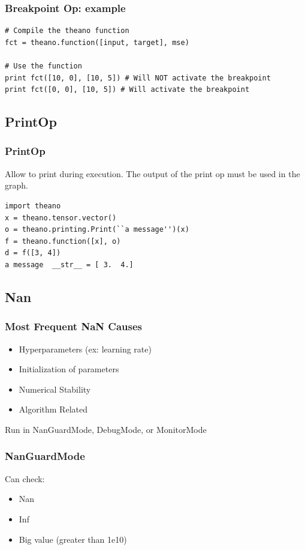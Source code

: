 \documentclass[utf8x,xcolor=pdftex,dvipsnames,table]{beamer}
\begin{document}
\begin{frame}[fragile]
  \frametitle{Breakpoint Op: example}
\begin{lstlisting}
# Compile the theano function
fct = theano.function([input, target], mse)

# Use the function
print fct([10, 0], [10, 5]) # Will NOT activate the breakpoint
print fct([0, 0], [10, 5]) # Will activate the breakpoint
\end{lstlisting}

\end{frame}

\subsection{PrintOp}
\begin{frame}[fragile]
  \frametitle{PrintOp}
Allow to print during execution. The output of the print op must be
used in the graph.
 \vspace{1cm}
\begin{lstlisting}
import theano
x = theano.tensor.vector()
o = theano.printing.Print(``a message'')(x)
f = theano.function([x], o)
d = f([3, 4])
a message  __str__ = [ 3.  4.]
\end{lstlisting}
\end{frame}


\subsection{Nan}
\begin{frame}
  \frametitle{Most Frequent NaN Causes}
\begin{itemize}
\item Hyperparameters (ex: learning rate)
\item Initialization of parameters
\item Numerical Stability
\item Algorithm Related
\end{itemize}
Run in NanGuardMode, DebugMode, or MonitorMode
\end{frame}

\begin{frame}[fragile]
  \frametitle{NanGuardMode}
Can check:
\begin{itemize}
\item Nan
\item Inf
\item Big value (greater than 1e10)
\end{itemize}
\end{frame}
\end{document}
